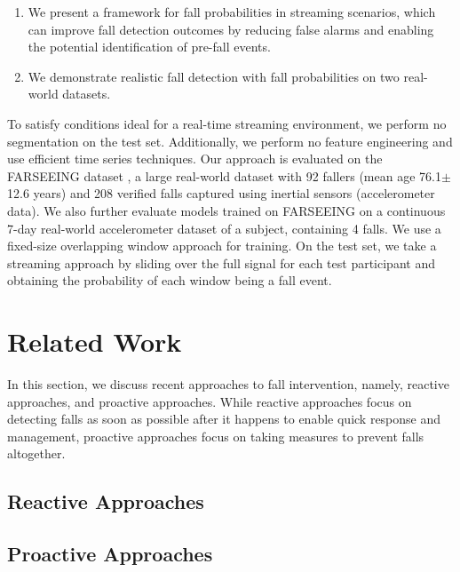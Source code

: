 \documentclass[runningheads]{llncs}
\begin{document}
\begin{enumerate}
    \item We present a framework for fall probabilities in streaming scenarios, which can improve fall detection outcomes by reducing false alarms and enabling the potential identification of pre-fall events.
    \item We demonstrate realistic fall detection with fall probabilities on two real-world datasets.
\end{enumerate}

To satisfy conditions ideal for a real-time streaming environment, we perform no segmentation on the test set. Additionally, we perform no feature engineering and use efficient time series techniques. Our approach is evaluated on the FARSEEING dataset \cite{klenk2016farseeing}, a large real-world dataset with 92 fallers (mean age 76.1$\pm$12.6 years) and 208 verified falls captured using inertial sensors (accelerometer data). We also further evaluate models trained on FARSEEING on a continuous 7-day real-world accelerometer dataset of a subject, containing 4 falls. We use a fixed-size overlapping window approach for training. On the test set, we take a streaming approach by sliding over the full signal for each test participant and obtaining the probability of each window being a fall event.

\section{Related Work}
In this section, we discuss recent approaches to fall intervention, namely, reactive approaches, and proactive approaches. While reactive approaches focus on detecting falls as soon as possible after it happens to enable quick response and management, proactive approaches focus on taking measures to prevent falls altogether.
\subsection{Reactive Approaches}
\subsection{Proactive Approaches}
\end{document}
